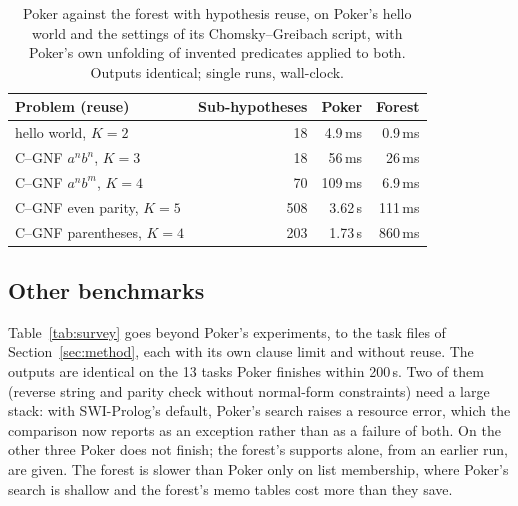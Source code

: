 \documentclass[11pt]{article}
\begin{document}
\begin{table}[ht]
\centering
\small
\begin{tabular}{lrrr}
\toprule
Problem (reuse) & Sub-hypotheses & Poker & Forest\\
\midrule
hello world, $K=2$                 & 18  & 4.9\,ms  & 0.9\,ms\\
C--GNF $a^nb^n$, $K=3$             & 18  & 56\,ms   & 26\,ms\\
C--GNF $a^nb^m$, $K=4$             & 70  & 109\,ms  & 6.9\,ms\\
C--GNF even parity, $K=5$          & 508 & 3.62\,s  & 111\,ms\\
C--GNF parentheses, $K=4$          & 203 & 1.73\,s  & 860\,ms\\
\bottomrule
\end{tabular}
\caption{Poker against the forest with hypothesis reuse, on Poker's hello world and
the settings of its Chomsky--Greibach script, with Poker's own unfolding of
invented predicates applied to both. Outputs identical; single runs, wall-clock.}
\label{tab:reuse}
\end{table}

\subsection{Other benchmarks}

Table~\ref{tab:survey} goes beyond Poker's experiments, to the task files of
Section~\ref{sec:method}, each with its own clause limit and without reuse.
The outputs are identical on the 13 tasks Poker finishes within 200\,s. Two of them
(reverse string and parity check without normal-form constraints) need a large
stack: with SWI-Prolog's default, Poker's search raises a resource error, which
the comparison now reports as an exception rather than as a failure of both. On the
other three Poker does not finish; the forest's supports alone, from an earlier
run, are given. The forest is slower than Poker only on list membership, where
Poker's search is shallow and the forest's memo tables cost more than they save.
\end{document}
